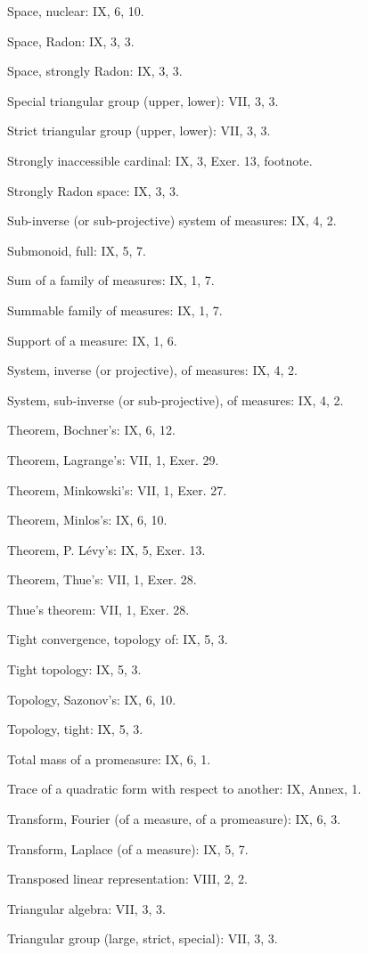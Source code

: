 Space, nuclear: IX, 6, 10.

Space, Radon: IX, 3, 3.

Space, strongly Radon: IX, 3, 3.

Special triangular group (upper, lower): VII, 3, 3.

Strict triangular group (upper, lower): VII, 3, 3.

Strongly inaccessible cardinal: IX, 3, Exer. 13, footnote.

Strongly Radon space: IX, 3, 3.

Sub-inverse (or sub-projective) system of measures: IX, 4, 2.

Submonoid, full: IX, 5, 7.

Sum of a family of measures: IX, 1, 7.

Summable family of measures: IX, 1, 7.

Support of a measure: IX, 1, 6.

System, inverse (or projective), of measures: IX, 4, 2.

System, sub-inverse (or sub-projective), of measures: IX, 4, 2.

Theorem, Bochner's: IX, 6, 12.

Theorem, Lagrange's: VII, 1, Exer. 29.

Theorem, Minkowski's: VII, 1, Exer. 27.

Theorem, Minlos's: IX, 6, 10.

Theorem, P. Lévy's: IX, 5, Exer. 13.

Theorem, Thue's: VII, 1, Exer. 28.

Thue's theorem: VII, 1, Exer. 28.

Tight convergence, topology of: IX, 5, 3.

Tight topology: IX, 5, 3.

Topology, Sazonov's: IX, 6, 10.

Topology, tight: IX, 5, 3.

Total mass of a promeasure: IX, 6, 1.

Trace of a quadratic form with respect to another: IX, Annex, 1.

Transform, Fourier (of a measure, of a promeasure): IX, 6, 3.

Transform, Laplace (of a measure): IX, 5, 7.

Transposed linear representation: VIII, 2, 2.

Triangular algebra: VII, 3, 3.

Triangular group (large, strict, special): VII, 3, 3.

